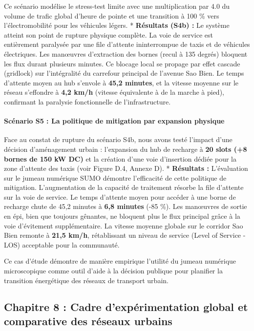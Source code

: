 \documentclass[11pt, a4paper]{article}
\begin{document}
Ce scénario modélise le stress-test limite avec une multiplication par
4.0 du volume de trafic global d'heure de pointe et une transition à 100
\% vers l'électromobilité pour les véhicules légers. * \textbf{Résultats
(S4b) :} Le système atteint son point de rupture physique complète. La
voie de service est entièrement paralysée par une file d'attente
ininterrompue de taxis et de véhicules électriques. Les manœuvres
d'extraction des bornes (recul à 135 degrés) bloquent les flux durant
plusieurs minutes. Ce blocage local se propage par effet cascade
(gridlock) sur l'intégralité du carrefour principal de l'avenue Sao
Bien. Le temps d'attente moyen au hub s'envole à \textbf{45,2 minutes},
et la vitesse moyenne sur le réseau s'effondre à \textbf{4,2 km/h}
(vitesse équivalente à de la marche à pied), confirmant la paralysie
fonctionnelle de l'infrastructure.

\paragraph{Scénario S5 : La politique de mitigation par expansion
physique}\label{scuxe9nario-s5-la-politique-de-mitigation-par-expansion-physique}

Face au constat de rupture du scénario S4b, nous avons testé l'impact
d'une décision d'aménagement urbain : l'expansion du hub de recharge à
\textbf{20 slots (+8 bornes de 150 kW DC)} et la création d'une voie
d'insertion dédiée pour la zone d'attente des taxis (voir Figure D.4,
Annexe D). * \textbf{Résultats :} L'évaluation sur le jumeau numérique
SUMO démontre l'efficacité de cette politique de mitigation.
L'augmentation de la capacité de traitement résorbe la file d'attente
sur la voie de service. Le temps d'attente moyen pour accéder à une
borne de recharge chute de 45,2 minutes à \textbf{6,8 minutes} (-85 \%).
Les manœuvres de sortie en épi, bien que toujours gênantes, ne bloquent
plus le flux principal grâce à la voie d'évitement supplémentaire. La
vitesse moyenne globale sur le corridor Sao Bien remonte à \textbf{21,5
km/h}, rétablissant un niveau de service (Level of Service - LOS)
acceptable pour la communauté.

Ce cas d'étude démontre de manière empirique l'utilité du jumeau
numérique microscopique comme outil d'aide à la décision publique pour
planifier la transition énergétique des réseaux de transport urbain.

\newpage

\subsection{Chapitre 8 : Cadre d'expérimentation global et comparative
des réseaux
urbains}\label{chapitre-8-cadre-dexpuxe9rimentation-global-et-comparative-des-ruxe9seaux-urbains}
\end{document}
